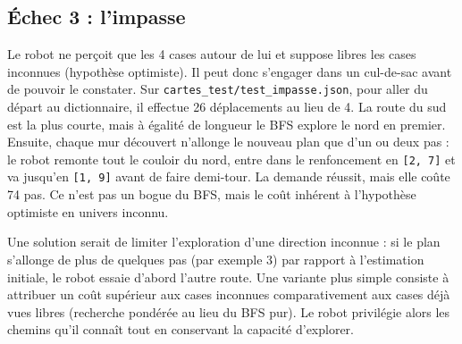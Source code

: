 \documentclass[11pt,a4paper]{article}
\begin{document}
\subsection{Échec 3 : l'impasse}
Le robot ne perçoit que les 4 cases autour de lui et suppose libres les cases inconnues (hypothèse optimiste). Il peut donc s'engager dans un cul-de-sac avant de pouvoir le constater. Sur \texttt{cartes\_test/test\_impasse.json}, pour aller du départ au dictionnaire, il effectue 26 déplacements au lieu de 4. La route du sud est la plus courte, mais à égalité de longueur le BFS explore le nord en premier. Ensuite, chaque mur découvert n'allonge le nouveau plan que d'un ou deux pas : le robot remonte tout le couloir du nord, entre dans le renfoncement en \texttt{[2, 7]} et va jusqu'en \texttt{[1, 9]} avant de faire demi-tour. La demande réussit, mais elle coûte 74 pas. Ce n'est pas un bogue du BFS, mais le coût inhérent à l'hypothèse optimiste en univers inconnu.

Une solution serait de limiter l'exploration d'une direction inconnue : si le plan s'allonge de plus de quelques pas (par exemple 3) par rapport à l'estimation initiale, le robot essaie d'abord l'autre route. Une variante plus simple consiste à attribuer un coût supérieur aux cases inconnues comparativement aux cases déjà vues libres (recherche pondérée au lieu du BFS pur). Le robot privilégie alors les chemins qu'il connaît tout en conservant la capacité d'explorer.
\end{document}
